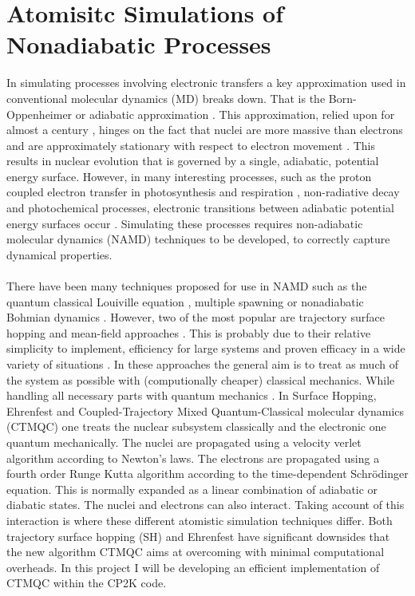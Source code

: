 \section{Atomisitc Simulations of Nonadiabatic Processes}
In simulating processes involving electronic transfers a key approximation used in conventional molecular dynamics (MD) breaks down. That is the Born-Oppenheimer or adiabatic approximation \cite{john_c._tully_nonadiabatic_nodate}. This approximation, relied upon for almost a century \cite{Pisana2007Feb}, hinges on the fact that nuclei are more massive than electrons and are approximately stationary with respect to electron movement \cite{Born1927Jan}. This results in nuclear evolution that is governed by a single, adiabatic, potential energy surface. However, in many interesting processes, such as the proton coupled electron transfer in photosynthesis and respiration
 \cite{Hammes-Schiffer2001Apr, Hammes-Schiffer1994Sep}, non-radiative decay and photochemical processes, electronic transitions between adiabatic potential energy surfaces occur \cite{tully_nonadiabatic_1991}. Simulating these processes requires non-adiabatic molecular dynamics (NAMD) techniques to be developed, to correctly capture dynamical properties.
\\\\
There have been many techniques proposed for use in NAMD such as the quantum classical Louiville equation \cite{Kapral1999May}, multiple spawning \cite{Martnnez*2005Oct} or nonadiabatic Bohmian dynamics \cite{Albareda2014Aug}. However, two of the most popular are trajectory surface hopping \cite{Tully1990Jul} and mean-field approaches \cite{Whetten85}. This is probably due to their relative simplicity to implement, efficiency for large systems and proven efficacy in a wide variety of situations
\cite{Shenvi2011Apr}. In these approaches the general aim is to treat as much of the system as possible with (computionally cheaper) classical mechanics. While handling all necessary parts with quantum mechanics \cite{Coker1995Jan}. In Surface Hopping, Ehrenfest and Coupled-Trajectory Mixed Quantum-Classical molecular dynamics (CTMQC) one treats the nuclear subsystem classically and the electronic one quantum mechanically. The nuclei are propagated using a velocity verlet algorithm according to Newton's laws. The electrons are propagated using a fourth order Runge Kutta algorithm according to the time-dependent Schr\"odinger equation. This is normally expanded as a linear combination of adiabatic or diabatic states. The nuclei and electrons can also interact. Taking account of this interaction is where these different atomistic simulation techniques differ. Both trajectory surface hopping (SH) and Ehrenfest have significant downsides that the new algorithm CTMQC aims at overcoming with minimal computational overheads. In this project I will be developing an efficient implementation of CTMQC within the CP2K code.
\newpage
